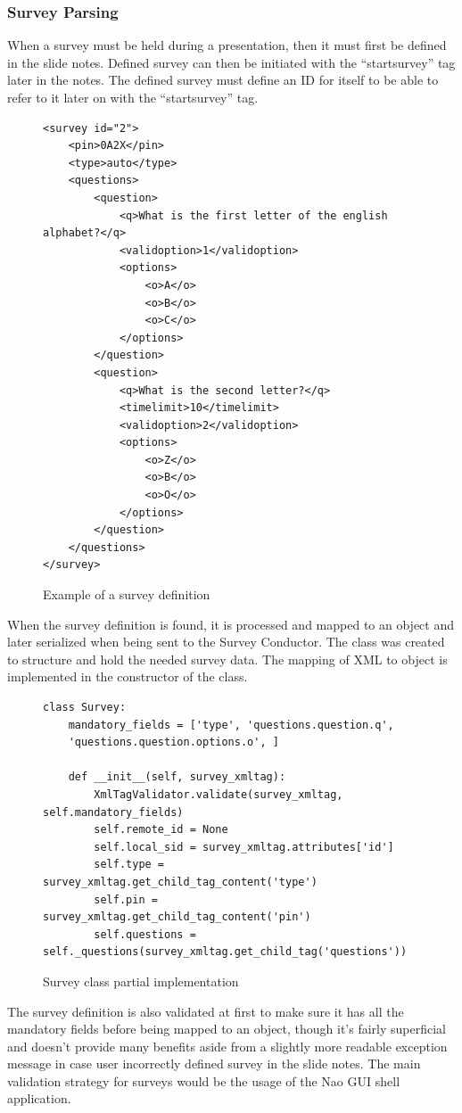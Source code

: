 \documentclass[12pt, fleqn, a4paper]{article}
\begin{document}
\subsubsection{Survey Parsing}
When a survey must be held during a presentation, then it must first be defined in the slide notes. Defined survey can then be initiated with the \enquote{startsurvey} tag later in the notes. The defined survey must define an ID for itself to be able to refer to it later on with the \enquote{startsurvey} tag.
\begin{figure}[H]
	\centering
	\begin{verbatim} 
<survey id="2">
	<pin>0A2X</pin>
	<type>auto</type>
	<questions>
		<question>
			<q>What is the first letter of the english alphabet?</q>
			<validoption>1</validoption>
			<options>
				<o>A</o>
				<o>B</o>
				<o>C</o>
			</options>
		</question>
		<question>
			<q>What is the second letter?</q>
			<timelimit>10</timelimit>
			<validoption>2</validoption>
			<options>
				<o>Z</o>
				<o>B</o>
				<o>O</o>
			</options>
		</question>
	</questions>
</survey>
	\end{verbatim}
	\caption{Example of a survey definition}
\end{figure}
When the survey definition is found, it is processed and mapped to an object and later serialized when being sent to the Survey Conductor. The class  was created to structure and hold the needed survey data. The mapping of XML to object is implemented in the constructor of the class.
\begin{figure}[H]
	\centering
	\begin{verbatim} 
class Survey:
    mandatory_fields = ['type', 'questions.question.q',
	'questions.question.options.o', ]

    def __init__(self, survey_xmltag):
        XmlTagValidator.validate(survey_xmltag, self.mandatory_fields)
        self.remote_id = None
        self.local_sid = survey_xmltag.attributes['id']
        self.type = survey_xmltag.get_child_tag_content('type')
        self.pin = survey_xmltag.get_child_tag_content('pin')
        self.questions = self._questions(survey_xmltag.get_child_tag('questions'))

	\end{verbatim}
	\caption{Survey class partial implementation}
\end{figure}
The survey definition is also validated at first to make sure it has all the mandatory fields before being mapped to an object, though it's fairly superficial and doesn't provide many benefits aside from a slightly more readable exception message in case user incorrectly defined survey in the slide notes. The main validation strategy for surveys would be the usage of the Nao GUI shell application.
\end{document}
